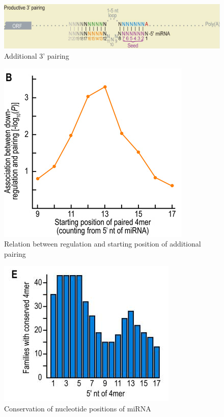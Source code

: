 \documentclass[12pt,  a4paper]{report}
\begin{document}
\begin{figure}[h]
\centering
\includegraphics[scale=0.4]{results/additional_pairing.PNG}
\caption{Additional 3' pairing}
\label{addipairing}
\end{figure}

\begin{figure}[h]
\centering
\includegraphics[scale=0.6]{results/sites_regulation.PNG} 
\caption{Relation between regulation and starting position of additional pairing}
\label{siteregulation}
\end{figure}

\begin{figure}[h]
\centering
\includegraphics[scale=0.65]{results/sites_conserved.PNG} 
\caption{Conservation of nucleotide positions of miRNA}
\label{conserved}
\end{figure}
\end{document}
